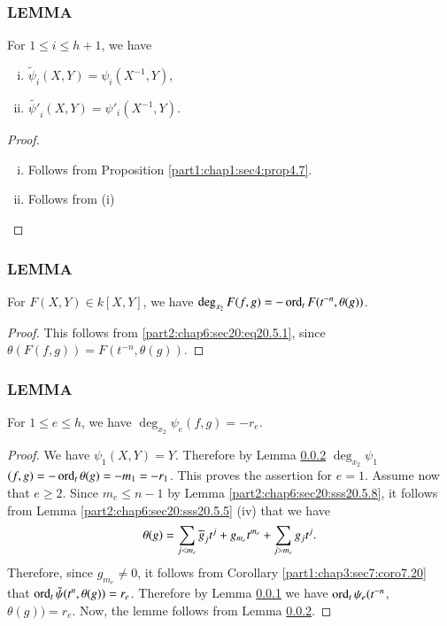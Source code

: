 \subsubsection{LEMMA}\label{part2:chap6:sec20:sss20.5.9}

For $1 \leq i \leq h+1$, we have
\begin{enumerate}[(i)]
\item $\tilde{\psi}_i (X, Y)= \psi_i (X^{-1}, Y)$,
  \item $\tilde{\psi'}_i (X, Y)= \psi'_i (X^{-1}, Y)$.
\end{enumerate}

\begin{proof}
\begin{enumerate}[(i)]
\item Follows from Proposition \ref{part1:chap1:sec4:prop4.7}.
\item Follows from (i)
\end{enumerate}
\end{proof}

\subsubsection{LEMMA}\label{part2:chap6:sec20:sss20.5.10}

For $F(X, Y) \in k[X, Y]$, we have $\deg_{x_2} F(f, g)= - \operatorname{ord}_t
F(t^{-n}, \theta (g))$.

\begin{proof}
  This follows from \ref{part2:chap6:sec20:eq20.5.1}, since
  $\theta(F(f, g))= F(t^{-n}, \theta (g))$.  
\end{proof}

\subsubsection{LEMMA} \label{part2:chap6:sec20:sss20.5.11}

For $1 \leq e \leq h$, we have $\deg_{x_2} \psi_e (f, g)= - r_e$.

\begin{proof}
  We have $\psi_1 (X, Y)= Y$. Therefore by
  Lemma \ref{part2:chap6:sec20:sss20.5.10} $\deg_{x_2} \psi_1$ $(f, g)=
  - \operatorname{ord}_t \theta (g) =- m_1= - r_1$. This proves the assertion for
  $e=1$. Assume now that $e \geq 2$. Since $m_e \leq n-1$ by
  Lemma \ref{part2:chap6:sec20:sss20.5.8}, it follows from Lemma
  \ref{part2:chap6:sec20:sss20.5.5} (iv) that we have
$$
\theta (g) = \sum_{j < m_e} \overline{g}_j t^j + g_{m_e} t^{m_e} + \sum_{j >
  m_e} g_j t^j.
$$
Therefore, since $g_{m_e} \neq 0$, it follows from
Corollary \ref{part1:chap3:sec7:coro7.20} that \break $\operatorname{ord}_t \tilde{\psi}
(t^n, \theta(g))= r_e$. Therefore by Lemma
\ref{part2:chap6:sec20:sss20.5.9} we have $\operatorname{ord}_t \psi_e (t^{-n}$,
 $\theta (g))= r_e$. Now, the lemme follows from Lemma
\ref{part2:chap6:sec20:sss20.5.10}. 
\end{proof}


